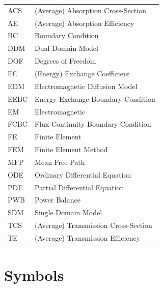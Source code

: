 \documentclass[a4paper]{article}
\numberwithin{equation}{section}
\begin{document}
\begin{supertabular}{m{2cm}l}
ACS              & (Average) Absorption Cross-Section  \\
AE               &(Average) Absorption Efficiency      \\
BC               &Boundary Condition                   \\
DDM              &Dual Domain Model                    \\
DOF              &Degrees of Freedom                   \\
EC               &(Energy) Exchange Coefficient        \\
EDM              &Electromagnetic Diffusion Model      \\
EEBC             &Energy Exchange Boundary Condition   \\
EM               &Electromagnetic                      \\
FCBC             &Flux Continuity Boundary Condition   \\
FE               &Finite Element                       \\
FEM              &Finite Element Method                \\
MFP              &Mean-Free-Path                       \\
ODE              &Ordinary Differential Equation       \\
PDE              &Partial Differential Equation        \\
PWB              &Power Balance                        \\
SDM              &Single Domain Model                  \\
TCS              &(Average) Transmission Cross-Section \\
TE               &(Average) Transmission Efficiency    \\
\end{supertabular}

\newpage
\section*{Symbols}
\label{sc:symbols}
\end{document}
